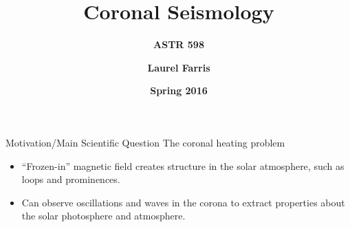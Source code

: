 \documentclass[table]{beamer}
\title{\textbf{Coronal Seismology}}
\subtitle{\textbf{ASTR 598}}
\date{\textbf{Spring 2016}}
\author{\textbf{Laurel Farris}}
\begin{document}
{
\begin{frame}
    \titlepage{}
\end{frame}}%

\begin{frame}{Motivation/Main Scientific Question}
    {The coronal heating problem}
    \begin{itemize}
        \item ``Frozen-in'' magnetic field creates structure in the
            solar atmosphere, such as loops and prominences.
        \item Can observe oscillations and waves in the corona to extract
            properties about the solar photosphere and atmosphere.
    \end{itemize}
\end{frame}%
\end{document}
